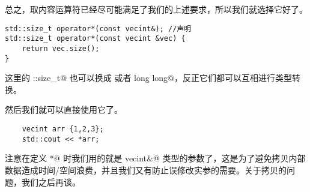 总之，取内容运算符已经尽可能满足了我们的上述要求，所以我们就选择它好了。
\begin{lstlisting}
std::size_t operator*(const vecint&); //声明
std::size_t operator*(const vecint &vec) {
    return vec.size();
}
\end{lstlisting}
这里的 \lstinline@std::size_t@ 也可以换成 \lstinline@unsigned@ 或者 \lstinline@unsigned long long@，反正它们都可以互相进行类型转换。\par
然后我们就可以直接使用它了。
\begin{lstlisting}
    vecint arr {1,2,3};
    std::cout << *arr;
\end{lstlisting}\par
注意在定义 \lstinline@operator*@ 时我们用的就是 \lstinline@const vecint&@ 类型的参数了，这是为了避免拷贝内部数据造成时间/空间浪费，并且我们又有防止误修改实参的需要。关于拷贝的问题，我们之后再谈。\par
